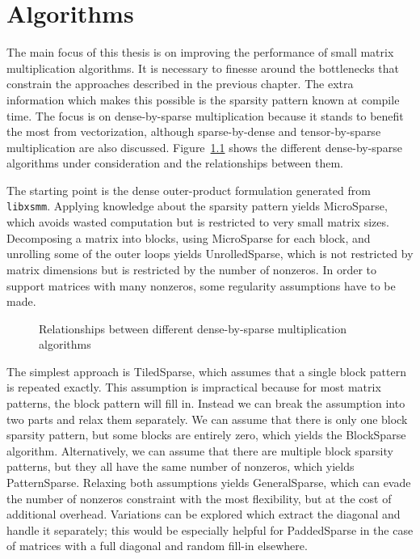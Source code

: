 \chapter{Algorithms}
\label{chapter:algs}

The main focus of this thesis is on improving the performance of small matrix multiplication algorithms. It is necessary to finesse around the bottlenecks that constrain the approaches described in the previous chapter. The extra information which makes this possible is the sparsity pattern known at compile time. The focus is on dense-by-sparse multiplication because it stands to benefit the most from vectorization, although sparse-by-dense and tensor-by-sparse multiplication are also discussed. Figure~\ref{fig:dxspfamilies} shows the different dense-by-sparse algorithms under consideration and the relationships between them. 

The starting point is the dense outer-product formulation generated from \texttt{libxsmm}. Applying knowledge about the sparsity pattern yields MicroSparse, which avoids wasted computation but is restricted to very small matrix sizes. Decomposing a matrix into blocks, using MicroSparse for each block, and unrolling some of the outer loops yields UnrolledSparse, which is not restricted by matrix dimensions but is restricted by the number of nonzeros. In order to support matrices with many nonzeros, some regularity assumptions have to be made. 

\begin{figure}[tbh]
  \centering
  
  \caption{Relationships between different dense-by-sparse multiplication algorithms}
  \label{fig:dxspfamilies}
\end{figure}


The simplest approach is TiledSparse, which assumes that a single block pattern is repeated exactly. This assumption is impractical because for most matrix patterns, the block pattern will fill in. Instead we can break the assumption into two parts and relax them separately. We can assume that there is only one block sparsity pattern, but some blocks are entirely zero, which yields the BlockSparse algorithm. Alternatively, we can assume that there are multiple block sparsity patterns, but they all have the same number of nonzeros, which yields PatternSparse. Relaxing both assumptions yields GeneralSparse, which can evade the number of nonzeros constraint with the most flexibility, but at the cost of additional overhead. Variations can be explored which extract the diagonal and handle it separately; this would be especially helpful for PaddedSparse in the case of matrices with a full diagonal and random fill-in elsewhere.

